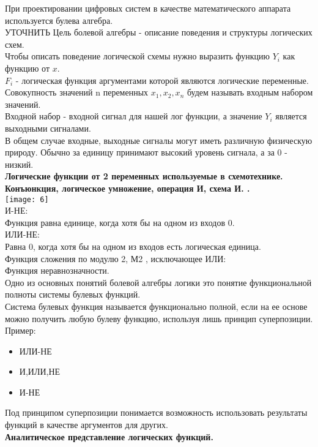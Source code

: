 При проектировании цифровых систем в качестве математического аппарата используется булева алгебра.\\
УТОЧНИТЬ
Цель болевой алгебры - описание поведения и структуры логических схем.\\
Чтобы описать поведение логической схемы нужно выразить функцию $Y_i$ как функцию от $x$.\\
$F_i$ - логическая функция аргументами которой являются логические переменные.\\
Совокупность значений n переменных $x_1, x_2, x_n$ будем называть входным набором значений.\\
Входной набор - входной сигнал для нашей лог функции, а значение $Y_i$ является выходными сигналами.\\
В общем случае входные, выходные сигналы могут иметь различную физическую природу. Обычно за единицу принимают высокий уровень сигнала, а за 0 - низкий.\\
\Large{ \textbf {
Логические функции от 2 переменных используемые в схемотехнике.\\
Конъюнкция, логическое умножение, операция И, схема И.
.}} \\
\texttt{[image: 6]} \\
И-НЕ:\\
Функция равна единице, когда хотя бы на одном из входов 0.\\
ИЛИ-НЕ:\\
Равна 0, когда хотя бы на одном из входов есть логическая единица.\\
Функция сложения по модулю 2, М2 , исключающее ИЛИ:\\
Функция неравнозначности.\\
Одно из основных понятий болевой алгебры логики это понятие функциональной полноты системы булевых функций.\\
Система булевых функция называется функционально полной, если на ее основе можно получить любую булеву функцию, используя лишь принцип суперпозиции.\\
Пример:
\begin{itemize}
  \item ИЛИ-НЕ
  \item И,ИЛИ,НЕ
  \item И-НЕ
\end{itemize}

Под принципом суперпозиции понимается возможность использовать результаты функций в качестве аргументов для других.\\
\Large{ \textbf {Аналитическое представление логических функций.}} \\

